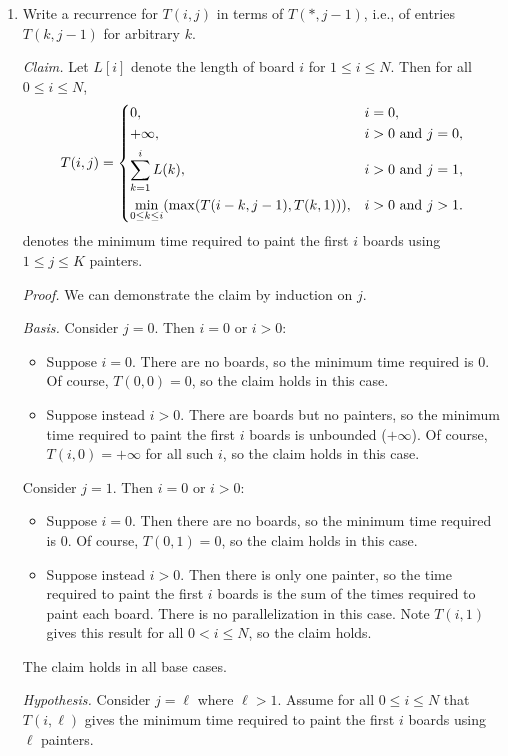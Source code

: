 \begin{enumerate}
\item Write a recurrence for $T(i,j)$ in terms of $T(*,j-1)$, i.e., of entries $T(k,j-1)$ for arbitrary $k$.
\begin{solution}
\textit{Claim. }Let $L[i]$ denote the length of board $i$ for $1\leq i\leq N$. Then for all $0\leq i\leq N$,
\begin{align*}
T(i,j)=\begin{dcases}
0,&i=0,\\
+\infty,&i>0\text{ and }j=0,\\
\sum_{k=1}^iL(k),&i>0\text{ and }j=1,\\
\min_{0\leq k\leq i}(\max(T(i-k,j-1),T(k,1))),&i>0\text{ and }j>1.
\end{dcases}
\end{align*}
denotes the minimum time required to paint the first $i$ boards using $1\leq j\leq K$ painters. 

\textit{Proof. }We can demonstrate the claim by induction on $j$.

\textit{Basis. }
Consider $j=0$. Then $i=0$ or $i>0$:
\begin{itemize}
    \item Suppose $i=0$. There are no boards, so the minimum time required is $0$. Of course, $T(0,0)=0$, so the claim holds in this case.
    \item Suppose instead $i>0$. There are boards but no painters, so the minimum time required to paint the first $i$ boards is unbounded ($+\infty$). Of course, $T(i,0)=+\infty$ for all such $i$, so the claim holds in this case.
\end{itemize}
Consider $j=1$. Then $i=0$ or $i>0$:
\begin{itemize}
    \item Suppose $i=0$. Then there are no boards, so the minimum time required is $0$. Of course, $T(0,1)=0$, so the claim holds in this case.
    \item Suppose instead $i>0$. Then there is only one painter, so the time required to paint the first $i$ boards is the sum of the times required to paint each board. There is no parallelization in this case. Note $T(i,1)$ gives this result for all $0<i\leq N$, so the claim holds.
\end{itemize}
The claim holds in all base cases.

\textit{Hypothesis. }Consider $j=\ell$ where $\ell>1$. Assume for all $0\leq i\leq N$ that $T(i,\ell)$ gives the minimum time required to paint the first $i$ boards using $\ell$ painters.


\end{solution}
\end{enumerate}
